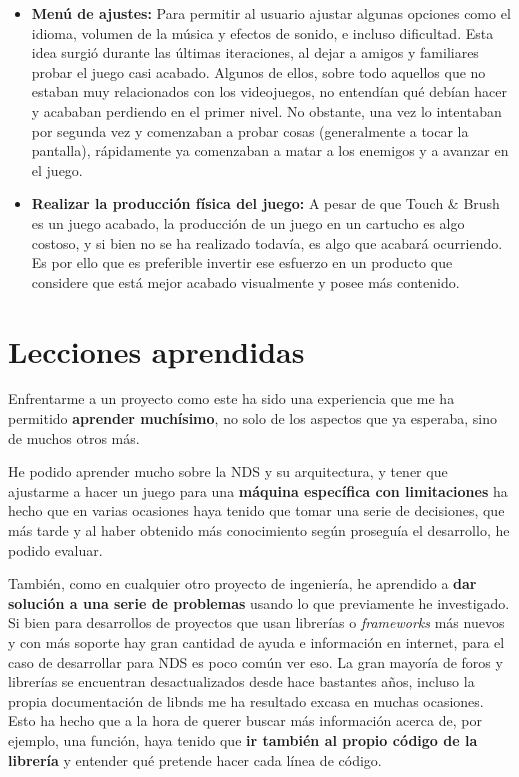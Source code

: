\begin{itemize}
  \item \textbf{Menú de ajustes:} Para permitir al usuario ajustar algunas opciones como el idioma, volumen de la música y efectos de sonido, e incluso dificultad. Esta idea surgió durante las últimas iteraciones, al dejar a amigos y familiares probar el juego casi acabado. Algunos de ellos, sobre todo aquellos que no estaban muy relacionados con los videojuegos, no entendían qué debían hacer y acababan perdiendo en el primer nivel. No obstante, una vez lo intentaban por segunda vez y comenzaban a probar cosas (generalmente a tocar la pantalla), rápidamente ya comenzaban a matar a los enemigos y a avanzar en el juego.
  
  \item \textbf{Realizar la producción física del juego:} A pesar de que Touch \& Brush es un juego acabado, la producción de un juego en un cartucho es algo costoso, y si bien no se ha realizado todavía, es algo que acabará ocurriendo. Es por ello que es preferible invertir ese esfuerzo en un producto que considere que está mejor acabado visualmente y posee más contenido.
\end{itemize}

\vspace{0.5cm}

\section{Lecciones aprendidas}

Enfrentarme a un proyecto como este ha sido una experiencia que me ha permitido \textbf{aprender muchísimo}, no solo de los aspectos que ya esperaba, sino de muchos otros más.

\vspace{0.5cm}

He podido aprender mucho sobre la NDS y su arquitectura, y tener que ajustarme a hacer un juego para una \textbf{máquina específica con limitaciones} ha hecho que en varias ocasiones haya tenido que tomar una serie de decisiones, que más tarde y al haber obtenido más conocimiento según proseguía el desarrollo, he podido evaluar.

\vspace{0.5cm}

También, como en cualquier otro proyecto de ingeniería, he aprendido a \textbf{dar solución a una serie de problemas} usando lo que previamente he investigado. Si bien para desarrollos de proyectos que usan librerías o \textit{frameworks} más nuevos y con más soporte hay gran cantidad de ayuda e información en internet, para el caso de desarrollar para NDS es poco común ver eso. La gran mayoría de foros y librerías se encuentran desactualizados desde hace bastantes años, incluso la propia documentación de libnds me ha resultado excasa en muchas ocasiones. Esto ha hecho que a la hora de querer buscar más información acerca de, por ejemplo, una función, haya tenido que \textbf{ir también al propio código de la librería} y entender qué pretende hacer cada línea de código.

